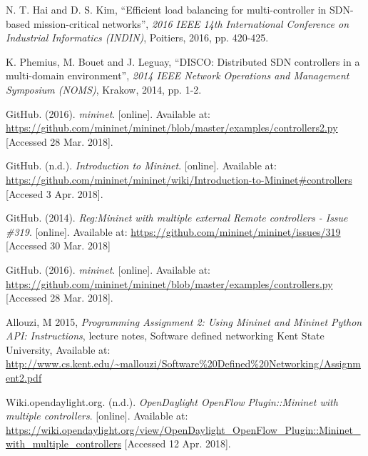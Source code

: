 \documentclass[12pt, a4paper]{article}
\begin{document}
\begin{thebibliography}{99}
  \footnotesize

  N. T. Hai and D. S. Kim,
  ``Efficient load balancing for multi-controller in SDN-based mission-critical networks'',
  \textit{2016 IEEE 14th International Conference on Industrial Informatics (INDIN)},
  Poitiers,
  2016,
  pp. 420-425.

  K. Phemius, M. Bouet and J. Leguay,
  ``DISCO: Distributed SDN controllers in a multi-domain environment'',
  \textit{2014 IEEE Network Operations and Management Symposium (NOMS)},
  Krakow,
  2014,
  pp. 1-2.

  GitHub. (2016).
  \textit{mininet}. [online].
  Available at: {\scriptsize \url{https://github.com/mininet/mininet/blob/master/examples/controllers2.py}}
  [Accessed 28 Mar. 2018].

  GitHub. (n.d.).
  \textit{Introduction to Mininet}. [online].
  Available at: {\scriptsize \url{https://github.com/mininet/mininet/wiki/Introduction-to-Mininet#controllers}}
  [Accesed 3 Apr. 2018].

  GitHub. (2014).
  \textit{Reg:Mininet with multiple external Remote controllers - Issue \#319}. [online].
  Available at: {\scriptsize \url{https://github.com/mininet/mininet/issues/319}}
  [Accessed 30 Mar. 2018]

  GitHub. (2016).
  \textit{mininet}. [online].
  Available at: {\scriptsize \url{https://github.com/mininet/mininet/blob/master/examples/controllers.py}}
  [Accessed 28 Mar. 2018].

  Allouzi, M 2015,
  \textit{Programming Assignment 2: Using Mininet and Mininet Python API: Instructions},
  lecture notes,
  Software defined networking Kent State University,
  Available at: {\scriptsize \url{http://www.cs.kent.edu/~mallouzi/Software%20Defined%20Networking/Assignment2.pdf}}

   Wiki.opendaylight.org. (n.d.).
   \textit{OpenDaylight OpenFlow Plugin::Mininet with multiple controllers}. [online].
   Available at: {\scriptsize \url{https://wiki.opendaylight.org/view/OpenDaylight_OpenFlow_Plugin::Mininet_with_multiple_controllers}}
   [Accessed 12 Apr. 2018].


\end{thebibliography}
\end{document}
